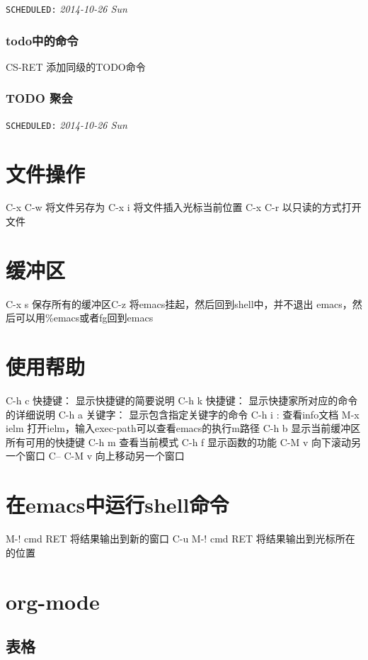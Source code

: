 \documentclass[11pt]{article}
\begin{document}
   \texttt{SCHEDULED:} \textit{2014-10-26 Sun}
\subsubsection{todo中的命令}
\label{sec-1-3-1}

CS-RET 添加同级的TODO命令
\subsubsection{\textbf{TODO} 聚会}
\label{sec-1-3-2}

    \texttt{SCHEDULED:} \textit{2014-10-26 Sun}
    
\section{文件操作}
\label{sec-2}

  C-x C-w 将文件另存为
  C-x i   将文件插入光标当前位置
  C-x C-r 以只读的方式打开文件
  
\section{缓冲区}
\label{sec-3}


  C-x s 保存所有的缓冲区C-z 将emacs挂起，然后回到shell中，并不退出
  emacs，然后可以用\%emacs或者fg回到emacs
  
\section{使用帮助}
\label{sec-4}

  C-h c 快捷键： 显示快捷键的简要说明
  C-h k 快捷键： 显示快捷家所对应的命令的详细说明
  C-h a 关键字： 显示包含指定关键字的命令
  C-h i      :  查看info文档
  M-x ielm      打开ielm，输入exec-path可以查看emacs的执行m路径
  C-h b 显示当前缓冲区所有可用的快捷键
  C-h m 查看当前模式
  C-h f 显示函数的功能
  C-M v 向下滚动另一个窗口
  C-- C-M v 向上移动另一个窗口
\section{在emacs中运行shell命令}
\label{sec-5}

  M-! cmd RET 将结果输出到新的窗口
  C-u M-! cmd RET 将结果输出到光标所在的位置
  
\section{org-mode}
\label{sec-6}
\subsection{表格}
\label{sec-6-1}
\end{document}
